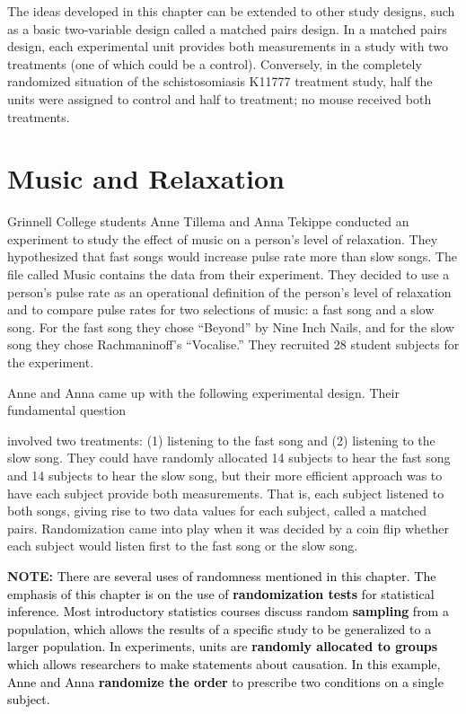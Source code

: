 \documentclass[
]{report}
\theoremstyle{definition}
\theoremstyle{definition}
\theoremstyle{definition}
\theoremstyle{definition}
\theoremstyle{remark}
\begin{document}
The ideas developed in this chapter can be extended to other study designs, such as a basic two-variable design
called a matched pairs design. In a matched pairs design, each experimental unit provides both measurements
in a study with two treatments (one of which could be a control). Conversely, in the completely randomized
situation of the schistosomiasis K11777 treatment study, half the units were assigned to control and half to
treatment; no mouse received both treatments.

\hypertarget{music-and-relaxation}{%
\section*{Music and Relaxation}\label{music-and-relaxation}}

Grinnell College students Anne Tillema and Anna Tekippe conducted an experiment to study the effect of
music on a person's level of relaxation. They hypothesized that fast songs would increase pulse rate more
than slow songs. The file called Music contains the data from their experiment. They decided to use a person's
pulse rate as an operational definition of the person's level of relaxation and to compare pulse rates for two selections of music: a fast song and a slow song. For the fast song they chose ``Beyond'' by Nine Inch
Nails, and for the slow song they chose Rachmaninoff's ``Vocalise.'' They recruited 28 student subjects for
the experiment.

Anne and Anna came up with the following experimental design. Their fundamental question

involved two treatments: (1) listening to the fast song and (2) listening to the slow song. They could
have randomly allocated 14 subjects to hear the fast song and 14 subjects to hear the slow song, but
their more efficient approach was to have each subject provide both measurements. That is, each subject
listened to both songs, giving rise to two data values for each subject, called a matched pairs. Randomization
came into play when it was decided by a coin flip whether each subject would listen first to the
fast song or the slow song.

\large

\textbf{NOTE:}
\textcolor{black}{There are several uses of randomness mentioned in this chapter. The emphasis of this chapter is on the
use of \textbf{randomization tests} for statistical inference. Most introductory statistics courses discuss random
\textbf{sampling} from a population, which allows the results of a specific study to be generalized to a larger
population. In experiments, units are \textbf{randomly allocated to groups} which allows researchers to make
statements about causation. In this example, Anne and Anna \textbf{randomize the order} to prescribe two
conditions on a single subject.}
\end{document}
